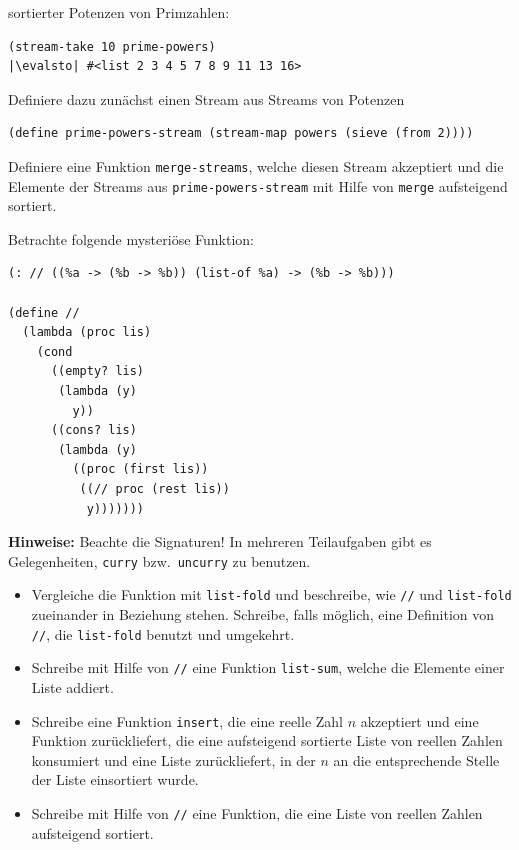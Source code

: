 \begin{aufgabe}
\begin{enumerate}
     sortierter Potenzen von Primzahlen:
     \begin{lstlisting}
(stream-take 10 prime-powers)
|\evalsto| #<list 2 3 4 5 7 8 9 11 13 16>
     \end{lstlisting}
     Definiere dazu zunächst einen Stream aus Streams von Potenzen
     \begin{lstlisting}
(define prime-powers-stream (stream-map powers (sieve (from 2))))
     \end{lstlisting}
     Definiere eine Funktion \lstinline{merge-streams}, welche
     diesen Stream akzeptiert und die Elemente der Streams
     aus \lstinline{prime-powers-stream} mit Hilfe von \lstinline{merge}
     aufsteigend sortiert.
   \end{enumerate}
 \end{aufgabe}

 \begin{aufgabe}
  Betrachte folgende mysteriöse Funktion:
\begin{lstlisting}
(: // ((%a -> (%b -> %b)) (list-of %a) -> (%b -> %b)))

(define //
  (lambda (proc lis)
    (cond
      ((empty? lis)
       (lambda (y)
         y))
      ((cons? lis)
       (lambda (y)
         ((proc (first lis))
          ((// proc (rest lis))
           y)))))))
\end{lstlisting}
  \textbf{Hinweise:} Beachte die Signaturen! In mehreren
  Teilaufgaben gibt es Gelegenheiten, \lstinline{curry} bzw.\
  \lstinline{uncurry} zu benutzen.

  \begin{itemize}
  \item Vergleiche die Funktion mit \lstinline{list-fold} und
    beschreibe, wie \lstinline{//} und \lstinline{list-fold} zueinander
    in Beziehung stehen.  Schreibe, falls möglich, eine
    Definition von \lstinline{//}, die \lstinline{list-fold} benutzt und
    umgekehrt.
  \item Schreibe mit Hilfe von \lstinline{//} eine Funktion
    \lstinline{list-sum}, welche die Elemente einer Liste addiert.
  \item Schreibe eine Funktion \lstinline{insert}, die eine reelle
    Zahl $n$ akzeptiert und eine Funktion zurückliefert, die eine
    aufsteigend sortierte Liste von reellen Zahlen konsumiert und
    eine Liste zurückliefert, in der $n$ an die entsprechende
    Stelle der Liste einsortiert wurde.
  \item Schreibe mit Hilfe von \lstinline{//} eine Funktion, die
    eine Liste von reellen Zahlen aufsteigend sortiert.
  \end{itemize}
\end{aufgabe}


